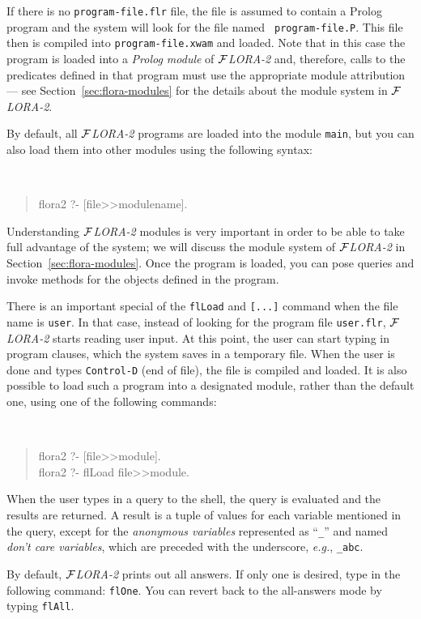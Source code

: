 \documentclass[11pt]{article}
\newcommand{\FLORA}{{\mbox{${\cal F}${\small\it LORA}\rm\emph{-2}}}\xspace}
\newcommand{\ofile}{xwam}
\begin{document}
If there is no {\tt program-file.flr} file, the file is assumed to contain
a Prolog program and the system will look for the file named {\tt
  program-file.P}. This file then is compiled into {\tt program-file.\ofile} and
loaded. Note that in this case the program is loaded into a {\em Prolog
  module} of \FLORA and, therefore, calls to the predicates defined in that
program must use the appropriate module attribution --- see
Section~\ref{sec:flora-modules} for the details about the module system in
\FLORA.

By default, all \FLORA programs are loaded into the module {\tt main}, but
you can also load them into other modules using the following syntax:
{\tt
\begin{quote}
 flora2 ?-  [file>>modulename].
\end{quote}
}
Understanding \FLORA modules is very important in order to be able to take
full advantage of the system; we will discuss the module system of \FLORA
in Section~\ref{sec:flora-modules}.  Once the program is loaded, you can
pose queries and invoke methods for the objects defined in the program.

There is an important special of the {\tt flLoad} and {\tt [...]} command
when the file name is {\tt user}. In that case, instead of looking for the
program file {\tt user.flr}, \FLORA starts reading user input. At this
point, the user can start typing in program clauses, which the system saves
in a temporary file. When the user is done and types {\tt Control-D} (end
of file), the file is compiled and loaded. It is also possible to load such
a program into a designated module, rather than the default one,
using one of the following commands:
{\tt
\begin{quote}
  flora2 ?- [file>>module].\\
  flora2 ?- flLoad file>>module.
\end{quote}
}

When the user types in a query to the shell, the query is evaluated and the
results are returned. A result is a tuple of values for each variable
mentioned in the query, except for the \emph{anonymous variables}
represented as ``{\tt \_}'' and named {\em don't care variables}, which are
preceded with the underscore, {\it e.g.}, {\tt \_abc}.

By default, \FLORA prints out all answers. If only one is desired, type in
the following command: {\tt flOne}. You can revert back to the all-answers
mode by typing {\tt flAll}.
\end{document}
